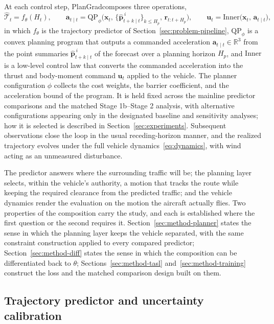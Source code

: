 \documentclass[11pt]{article}
\theoremstyle{plain}
\theoremstyle{definition}
\newcommand{\R}{\mathbb{R}}
\newcommand{\method}{PlanGrad}
\newcommand{\bx}{\bm{x}}
\newcommand{\bu}{\bm{u}}
\begin{document}
At each control step, \method composes three operations,
\begin{equation}
	\label{eq:method-composition}
	\widehat{\mathcal{T}}_t = f_{\theta}(H_t),
	\qquad
	\bm{a}_{t \mid t}
	= \mathrm{QP}_{\phi}\big( \bx_t,\,
	\{\hat{\bm{p}}^{\,i}_{t+k \mid t}\}_{k \leq H_p},\,
	\bm{r}_{t:t+H_p} \big),
	\qquad
	\bu_t = \mathrm{Inner}\big( \bx_t,\, \bm{a}_{t \mid t} \big),
\end{equation}
in which $f_{\theta}$ is the trajectory predictor of
Section~\ref{sec:problem-pipeline}, $\mathrm{QP}_{\phi}$ is a convex
planning program that outputs a commanded acceleration
$\bm{a}_{t \mid t} \in \R^3$ from the point summaries
$\hat{\bm{p}}^{\,i}_{t+k \mid t}$ of the forecast over a planning
horizon $H_p$, and $\mathrm{Inner}$ is a low-level control law that
converts the commanded acceleration into the thrust and body-moment
command $\bu_t$ applied to the vehicle. The planner configuration
$\phi$ collects the cost weights, the barrier coefficient, and the
acceleration bound of the program. It is held fixed across the
mainline predictor comparisons and the matched Stage 1b--Stage 2
analysis, with alternative configurations appearing only in the
designated baseline and sensitivity analyses; how it is selected is
described in Section~\ref{sec:experiments}. Subsequent observations close the loop
in the usual receding-horizon manner, and the realized trajectory
evolves under the full vehicle dynamics~\eqref{eq:dynamics}, with wind
acting as an unmeasured disturbance.
 
The predictor answers where the surrounding traffic will be; the
planning layer selects, within the vehicle's authority, a motion that
tracks the route while keeping the required clearance from the
predicted traffic; and the vehicle dynamics render the evaluation on
the motion the aircraft actually flies. Two properties of the
composition carry the study, and each is established where the first
question or the second requires it.
Section~\ref{sec:method-planner} states the sense in which the
planning layer keeps the vehicle separated, with the same constraint construction applied to every
compared predictor;
Section~\ref{sec:method-diff} states the sense in which the
composition can be differentiated back to $\theta$;
Sections~\ref{sec:method-tasl} and~\ref{sec:method-training}
construct the loss and the matched comparison design built on them.
 
\subsection{Trajectory predictor and uncertainty calibration}
\label{sec:method-pred}
 
\end{document}

